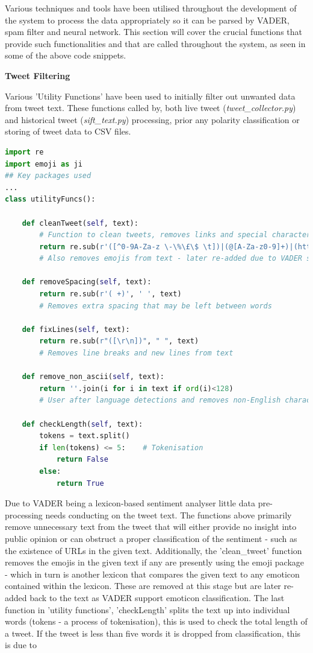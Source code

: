 \documentclass[oneside, 12pt]{article}
\begin{document}
			Various techniques and tools have been utilised throughout the development of the system to process the data appropriately so it can be parsed by VADER, spam filter and neural network. This section will cover the crucial functions that provide such functionalities and that are called throughout the system, as seen in some of the above code snippets.
			\newline
			
			\textbf{Tweet Filtering}
			
			Various 'Utility Functions' have been used to initially filter out unwanted data from tweet text. These functions called by, both live tweet (\textit{tweet\_collector.py}) and historical tweet (\textit{sift\_text.py}) processing, prior any polarity classification or storing of tweet data to CSV files.
				
				\begin{lstlisting}[language=python, caption=Basic data filtering and processing function - defined in 'tweet\_collector.py']
import re
import emoji as ji
## Key packages used
...
class utilityFuncs():
				
	def cleanTweet(self, text):
		# Function to clean tweets, removes links and special characters
		return re.sub(r'([^0-9A-Za-z \-\%\£\$ \t])|(@[A-Za-z0-9]+)|(http\S+)', '', text), ' '.join(c for c in text if c in ji.UNICODE_EMOJI)
		# Also removes emojis from text - later re-added due to VADER supporting emoticons
				
	def removeSpacing(self, text):
		return re.sub(r'( +)', ' ', text)
		# Removes extra spacing that may be left between words
				
	def fixLines(self, text):
		return re.sub(r"([\r\n])", " ", text)
		# Removes line breaks and new lines from text
								
	def remove_non_ascii(self, text):
		return ''.join(i for i in text if ord(i)<128)
		# User after language detections and removes non-English characters from text
		
	def checkLength(self, text):
		tokens = text.split()
		if len(tokens) <= 5:	# Tokenisation
			return False
		else:
			return True
				\end{lstlisting}
				
		    Due to VADER being a lexicon-based sentiment analyser little data pre-processing needs conducting on the tweet text. The functions above primarily remove unnecessary text from the tweet that will either provide no insight into public opinion or can obstruct a proper classification of the sentiment - such as the existence of URLs in the given text. Additionally, the 'clean\_tweet' function removes the emojis in the given text if any are presently using the emoji package - which in turn is another lexicon that compares the given text to any emoticon contained within the lexicon. These are removed at this stage but are later re-added back to the text as VADER support emoticon classification. 
			The last function in 'utility functions', 'checkLength' splits the text up into individual words (tokens - a process of tokenisation), this is used to check the total length of a tweet. If the tweet is less than five words it is dropped from classification, this is due to 
			\newline
			
\end{document}
